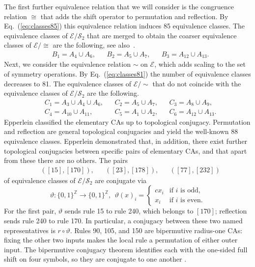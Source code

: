 \documentclass[11pt,a4paper]{article}
\newcommand{\rev}[1]{{\color{blue}#1}}
\newcommand{\rev}[1]{{\color{black}#1}}
\begin{document}
The first further equivalence relation that we will consider is the congruence relation $\cong$ that
adds the shift operator to permutation and reflection.
By Eq.~(\ref{eq:classes85}) this equivalence relation induces 85 equivalence classes.
The equivalence classes of $\mathcal{E} / \mathcal{S}_2$ that are merged to obtain the coarser equivalence classes of
$\mathcal{E} / {\cong}$ are the following, see also~\cite{RUIVO2018280}.
\begin{align*}
& B_1 = A_4 \cup A_6, & & B_2 = A_5 \cup A_7, & & B_3 = A_{12} \cup A_{13}.
\end{align*}
Next, we consider the equivalence relation $\sim$ on $\mathcal{E}$, which adds scaling to the set of
symmetry operations.
By Eq.~(\ref{eq:classes81}) the number of equivalence classes decreases to 81.
The equivalence classes of $\mathcal{E} / {\sim}$ that do not coincide with the equivalence classes of
$\mathcal{E} / \mathcal{S}_2$ are the following.
\begin{align*}
& C_1 = A_3 \cup A_4 \cup A_6, & & C_2=A_5 \cup A_7, & & C_3=A_8 \cup A_9,  \\
& C_4 = A_{10} \cup A_{11}, & & C_5 = A_1 \cup A_2, & & C_6 = A_{12} \cup A_{13}.
\end{align*}
Epperlein \cite{epperlein2015classification, epperlein2017}
classified the elementary CAs up to topological conjugacy.
Permutation and reflection are general topological conjugacies and yield
the well-known 88 equivalence classes.
Epperlein demonstrated that, in addition, there exist further topological conjugacies between
specific pairs of elementary CAs, and that apart from these there are no others.
The pairs
\begin{align*}
& ([15], [170]), & & ([23], [178]), & & ([77],[232])
\end{align*}
of equivalence classes of $\mathcal{E} / \mathcal{S}_2$ \rev{are conjugate
via}
\[
\vartheta: \{0,1\}^\mathbb{Z} \to \{0,1\}^\mathbb{Z},  \ \
\vartheta(x)_i =
\begin{cases}
cx_i & \text{if $i$ is odd,} \\
x_i & \text{if $i$ is even.}
\end{cases}
\]
\rev{For the first pair, $\vartheta$ sends rule 15 to rule 240,
which belongs to $[170]$; reflection sends rule 240 to rule 170.
In particular, a conjugacy between these two named representatives
is $r\circ\vartheta$.
Rules 90, 105, and 150 are bipermutive radius-one CAs: fixing the
other two inputs makes the local rule a permutation of either outer
input. The bipermutive conjugacy theorem identifies each with the
one-sided full shift on four symbols, so they are conjugate to one
another \cite{Kurka2003TopologicalAS,epperlein2015classification}.}
\end{document}
